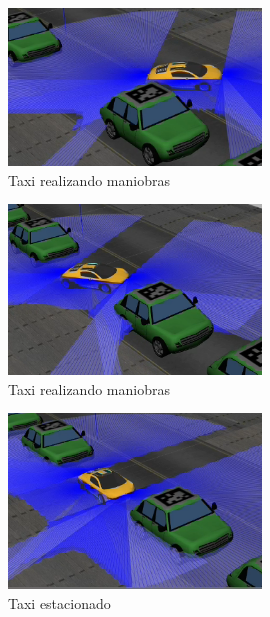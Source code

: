 \begin{figure}[H]
  \begin{center}
    \includegraphics[width=0.6\textwidth]{figures/Autopark/Experimento2_2.png}
		\caption{Taxi realizando maniobras}
		\label{fig.Experimento2_2}
		\end{center}
\end{figure}

\begin{figure}[H]
  \begin{center}
    \includegraphics[width=0.6\textwidth]{figures/Autopark/Experimento2_3.png}
		\caption{Taxi realizando maniobras}
		\label{fig.Experimento2_3}
		\end{center}
\end{figure}

\begin{figure}[H]
  \begin{center}
    \includegraphics[width=0.6\textwidth]{figures/Autopark/Experimento2_4.png}
		\caption{Taxi estacionado}
		\label{fig.Experimento2_4}
		\end{center}
\end{figure}